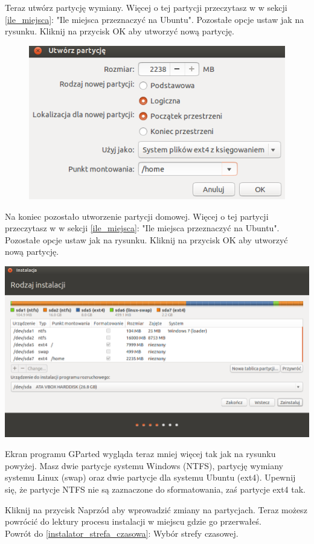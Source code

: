 Teraz utwórz partycję wymiany. Więcej o tej partycji przeczytasz w w sekcji \ref{ile_miejsca}: "Ile miejsca przeznaczyć na Ubuntu". Pozostałe opcje ustaw jak na rysunku. Kliknij na przycisk \textcolor{ubuntu_orange}{OK} aby utworzyć nową partycję.
\begin{figure}
                \includegraphics[width=\linewidth]{images/instalator_partycjonowanie_gparted_dodaj_home.png}
\end{figure}
Na koniec pozostało utworzenie partycji domowej. Więcej o tej partycji przeczytasz w w sekcji \ref{ile_miejsca}: "Ile miejsca przeznaczyć na Ubuntu". Pozostałe opcje ustaw jak na rysunku. Kliknij na przycisk \textcolor{ubuntu_orange}{OK} aby utworzyć nową partycję.
\clearpage
\begin{center}
        \includegraphics[width=\linewidth]{images/instalator_partycjonowanie_gparted4.png}
\end{center}
Ekran programu GParted wygląda teraz mniej więcej tak jak na rysunku powyżej. Masz dwie partycje systemu Windows (NTFS), partycję wymiany systemu Linux (swap) oraz dwie partycje dla systemu Ubuntu (ext4). Upewnij się, że partycje NTFS \textcolor{ubuntu_orange}{nie} są zaznaczone do sformatowania, zaś partycje ext4 tak.

Kliknij na przycisk \textcolor{ubuntu_orange}{Naprzód} aby wprowadzić zmiany na partycjach. Teraz możesz powrócić do lektury procesu instalacji w miejscu gdzie go przerwałeś.\\
Powrót do \ref{instalator_strefa_czasowa}: Wybór strefy czasowej.
\clearpage
